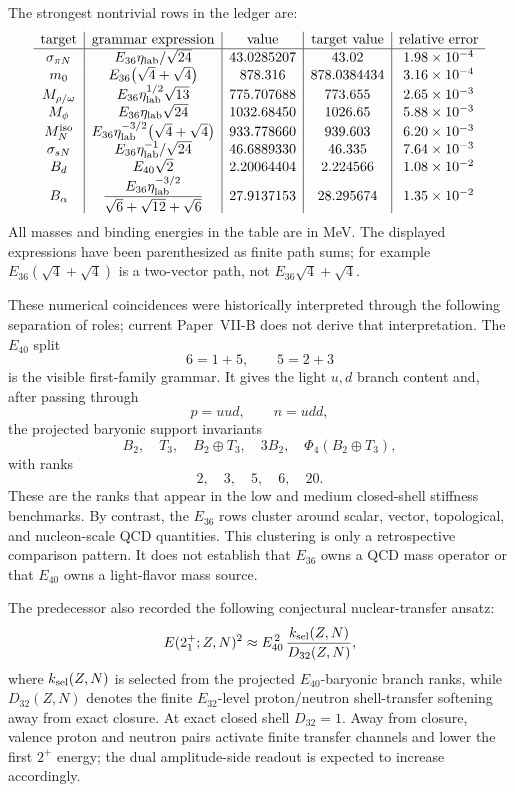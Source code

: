 \documentclass[12pt,a4paper]{article}
\begin{document}
The strongest nontrivial rows in the ledger are:
\[
\begin{array}{c|c|c|c|c}
\text{target} & \text{grammar expression} & \text{value} & \text{target value} & \text{relative error}\\
\hline
\sigma_{\pi N}
&
E_{36}\eta_{\rm lab}/\sqrt{24}
&
43.0285207
&
43.02
&
1.98\times10^{-4}
\\
m_0
&
E_{36}\bigl(\sqrt4+\sqrt4\bigr)
&
878.316
&
878.0384434
&
3.16\times10^{-4}
\\
M_{\rho/\omega}
&
E_{36}\eta_{\rm lab}^{1/2}\sqrt{13}
&
775.707688
&
773.655
&
2.65\times10^{-3}
\\
M_\phi
&
E_{36}\eta_{\rm lab}\sqrt{24}
&
1032.68450
&
1026.65
&
5.88\times10^{-3}
\\
M_N^{\rm iso}
&
E_{36}\eta_{\rm lab}^{-3/2}\bigl(\sqrt4+\sqrt4\bigr)
&
933.778660
&
939.603
&
6.20\times10^{-3}
\\
\sigma_{sN}
&
E_{36}\eta_{\rm lab}^{-1}/\sqrt{24}
&
46.6889330
&
46.335
&
7.64\times10^{-3}
\\
B_d
&
E_{40}\sqrt2
&
2.20064404
&
2.224566
&
1.08\times10^{-2}
\\
B_\alpha
&
\displaystyle
\frac{E_{36}\eta_{\rm lab}^{-3/2}}{\sqrt6+\sqrt{12}+\sqrt6}
&
27.9137153
&
28.295674
&
1.35\times10^{-2}
\end{array}
\]
All masses and binding energies in the table are in MeV.  The displayed expressions have been parenthesized as finite path sums; for example \(E_{36}(\sqrt4+\sqrt4)\) is a two-vector path, not \(E_{36}\sqrt4+\sqrt4\).

These numerical coincidences were historically interpreted through the following separation of roles; current Paper~VII-B does not derive that interpretation.  The \(E_{40}\) split
\[
        6=1+5,\qquad 5=2+3
\]
is the visible first-family grammar.  It gives the light \(u,d\) branch content and, after passing through
\[
        p=uud,\qquad n=udd,
\]
the projected baryonic support invariants
\[
        B_2,\quad T_3,\quad B_2\oplus T_3,\quad 3B_2,\quad \Phi_4(B_2\oplus T_3),
\]
with ranks
\[
        2,\quad3,\quad5,\quad6,\quad20.
\]
These are the ranks that appear in the low and medium closed-shell stiffness benchmarks.  By contrast, the \(E_{36}\) rows cluster around scalar, vector, topological, and nucleon-scale QCD quantities.  This clustering is only a retrospective comparison pattern.  It does not establish that \(E_{36}\) owns a QCD mass operator or that \(E_{40}\) owns a light-flavor mass source.

The predecessor also recorded the following conjectural nuclear-transfer ansatz:
\[
        E(2_1^+;Z,N)^2
        \approx
        E_{40}^{\,2}\,
        \frac{k_{\rm sel}(Z,N)}
        {D_{32}(Z,N)} ,
\]
where \(k_{\rm sel}(Z,N)\) is selected from the projected \(E_{40}\)-baryonic branch ranks, while \(D_{32}(Z,N)\) denotes the finite \(E_{32}\)-level proton/neutron shell-transfer softening away from exact closure.  At exact closed shell \(D_{32}=1\).  Away from closure, valence proton and neutron pairs activate finite transfer channels and lower the first \(2^+\) energy; the dual amplitude-side readout is expected to increase accordingly.
\end{document}
